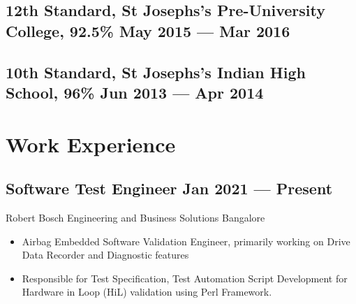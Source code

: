 \documentclass[a4,10pt]{article}
\newcommand{\subtext}[1]{
#1\par\vspace{-0.2cm}}
\newenvironment{zitemize}{
\begin{itemize}\itemsep0pt \parskip0pt \parsep1pt}
{\end{itemize}\vspace{-0.5cm}}
\begin{document}
\subsection*{12th Standard, {\normalsize \normalfont St Josephs's Pre-University College, 92.5\%} \hfill May 2015 --- Mar 2016}
\vspace{0.1cm}
\subsection*{10th Standard, {\normalsize \normalfont St Josephs's Indian High School, 96\%} \hfill Jun 2013 --- Apr 2014} 
\vspace{0.2cm}

\section{Work Experience}

        

\subsection*{Software Test Engineer \hfill Jan 2021 --- Present} 
\subtext{Robert Bosch Engineering and Business Solutions \hfill Bangalore} 
    \begin{zitemize}
        \item Airbag Embedded Software Validation Engineer, primarily working on Drive Data Recorder and Diagnostic features 
        \item Responsible for Test Specification, Test Automation Script Development for Hardware in Loop (HiL) validation using Perl Framework.
    \end{zitemize}
\end{document}
